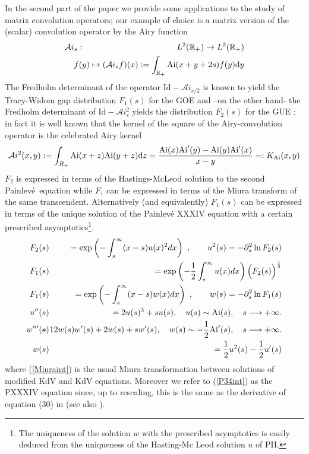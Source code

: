 \documentclass{article}
\def\&{&\hspace{-20pt}}
\def\R{{\mathbb R}}
\def\d{{\rm d}}
\def \pa{\partial}
\def\bea{\begin{eqnarray}}
\def\eea{\end{eqnarray}}
\def\Id{\mathrm{Id}}
\def\Ai{\mathrm{Ai}}
\def\Ai{\mathrm{Ai}}
\newcommand{\be}{\begin{eqnarray}}
\newcommand{\ee}{\end{eqnarray}}
\def\le{\left}
\def\ri{\right}
\begin{document}
In the second part of the paper we provide some applications to the study of matrix convolution operators; our example of choice is a matrix version of the (scalar) convolution operator by the Airy function \cite{FSGOE}
\be
\mathcal Ai_s: &\&L^2(\R_+)\to L^2(\R_+)\nonumber \\
&\& f(y)\mapsto (\mathcal Ai_s f)(x):= \int_{\R_+} \Ai(x+y+2s) f(y)\d y
\ee
The Fredholm determinant of the operator $\Id - \mathcal Ai_{s/2}$  is known to yield the Tracy-Widom gap distribution $F_1(s)$ for the GOE \cite{FSGOE} and --on the other hand- the Fredholm determinant of $\Id - \mathcal Ai_s^2$ yields the distribution $F_2(s)$ for the GUE \cite{MehtaBook} ; in fact it is well known that the kernel of the square of the Airy-convolution operator is the celebrated Airy kernel 
\be
\mathcal Ai^2(x,y) :=\int_{R_+} \Ai(x+z)\Ai(y+z) \d z = \frac {\Ai(x)\Ai'(y) - \Ai(y)\Ai'(x)}{x-y} =:K_{\Ai}(x,y)
\ee
 $F_2$ is expressed in terms of the Hastings-McLeod solution  \cite{Hastings-McLeod} to the second Painlev\'e\ equation \cite{TracyWidomLevel} while $F_1$ can be expressed in terms of the Miura transform of the same transcendent. Alternatively (and equivalently) $F_1(s)$ can be expressed in terms of the unique solution of the Painlev\'e XXXIV equation with a certain prescribed asymptotics\footnote{The uniqueness of the solution $w$ with the prescribed asymptotics is easily deduced from the uniqueness of the Hasting-Mc Leod solution $u$ of PII.}.
\bea
	F_2(s) &\&= \exp\le(-\int_{s}^\infty(x-s)u(x)^2dx\ri)\ ,\qquad u^2(s)  =-\pa_s^2 \ln F_2(s) \label{TW4}\\
	F_1(s) &\&= \exp\le(-\frac{1}{2}\int_{s}^\infty u(x)dx\ri)\Big(F_2(s)\Big)^{\frac{1}2}\label{TW3}\\
	F_1(s) &\&=\exp\le(-\int_{s}^\infty(x-s)w(x)dx\ri)\ , \qquad w(s) = -\pa_s^2\ln F_1(s) \label{TW3bis}\\
	u''(s)&\&= 2u(s)^3+su(s),\quad u(s)\sim\Ai(s),\quad s\longrightarrow +\infty.\label{TW5}\\
	w'''(s)&\&= 12w(s)w'(s)+2w(s) + s w'(s),\quad w(s)\sim-\frac{1}{2}\Ai'(s),\quad s \longrightarrow +\infty.\label{P34int}\\
	w(s)&\& = \frac 1 2 u^2(s) - \frac 1 2 u'(s)\label{Miuraint}
\eea
where (\ref{Miuraint}) is the usual Miura transformation between solutions of modified KdV and KdV equations. Moreover we refer to (\ref{P34int}) as the PXXXIV equation since, up to rescaling, this is the same as the derivative of equation (30) in \cite{CJP} (see also \cite{KajiwaraMasuda}).
\end{document}
